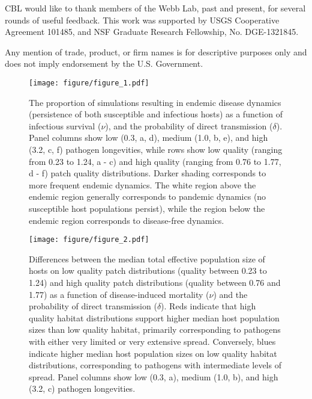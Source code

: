\documentclass{article}
\begin{document}
CBL would like to thank members of the Webb Lab, past and present, for several rounds of useful feedback.  This work was supported by USGS Cooperative Agreement 101485, and NSF Graduate Research Fellowship, No. DGE-1321845.

Any mention of trade, product, or firm names is for descriptive purposes only and does not imply endorsement by the U.S. Government.

\clearpage

     

\clearpage

\begin{figure}
\texttt{[image: figure/figure\_1.pdf]}
\caption{The proportion of simulations resulting in endemic disease dynamics (persistence of both susceptible and infectious hosts) as a function of infectious survival ($\nu$), and the probability of direct transmission ($\delta$).  Panel columns show low (0.3, a, d), medium (1.0, b, e), and high (3.2, c, f) pathogen longevities, while rows show low quality (ranging from 0.23 to 1.24, a - c) and high quality (ranging from 0.76 to 1.77, d - f) patch quality distributions.  Darker shading corresponds to more frequent endemic dynamics.  The white region above the endemic region generally corresponds to pandemic dynamics (no susceptible host populations persist), while the region below the endemic region corresponds to disease-free dynamics.}
\label{endemic}
\end{figure}

\begin{figure}
\texttt{[image: figure/figure\_2.pdf]}
\centering
\caption{Differences between the median total effective population size of hosts on low quality patch distributions (quality between 0.23 to 1.24) and high quality patch distributions (quality between 0.76 and 1.77) as a function of disease-induced mortality ($\nu$) and the probability of direct transmission ($\delta$).  Reds indicate that high quality habitat distributions support higher median host population sizes than low quality habitat, primarily corresponding to pathogens with either very limited or very extensive spread. Conversely, blues indicate higher median host population sizes on low quality habitat distributions, corresponding to pathogens with intermediate levels of spread.  Panel columns show low (0.3, a), medium (1.0, b), and high (3.2, c) pathogen longevities.}
\label{highvlow}
\end{figure}
\end{document}
